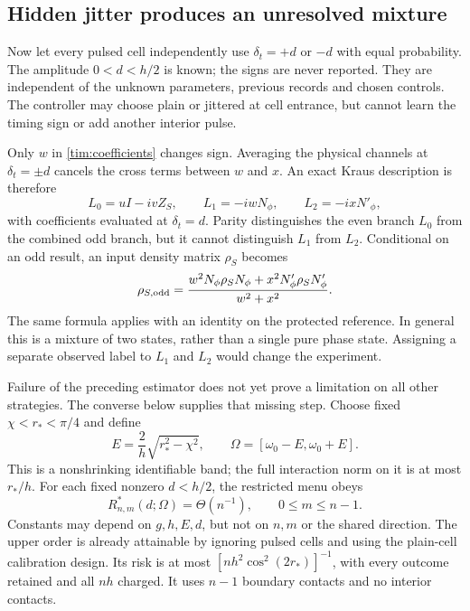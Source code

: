 \documentclass[11pt,a4paper]{article}
\numberwithin{equation}{section}
\theoremstyle{remark}
\begin{document}
\subsection{Hidden jitter produces an unresolved mixture}

Now let every pulsed cell independently use $\delta_t=+d$ or $-d$ with equal
probability. The amplitude $0<d<h/2$ is known; the signs are never reported.
They are independent of the unknown parameters, previous records and chosen
controls. The controller may choose plain or jittered at cell entrance,
but cannot learn the timing sign or add another interior pulse.

Only $w$ in \eqref{tim:coefficients} changes sign. Averaging the physical
channels at $\delta_t=\pm d$ cancels the cross terms between $w$ and $x$.
An exact Kraus description is therefore
\begin{equation}
 L_0=uI-ivZ_S,\qquad L_1=-iwN_\phi,\qquad L_2=-ixN'_\phi,
 \label{tim:jitter-kraus}
\end{equation}
with coefficients evaluated at $\delta_t=d$. Parity distinguishes the even
branch $L_0$ from the combined odd branch, but it cannot distinguish $L_1$
from $L_2$. Conditional on an odd result, an input density matrix $\rho_S$
becomes
\begin{equation}
 \rho_{S,\rm odd}
 =\frac{w^2N_\phi\rho_SN_\phi+x^2N'_\phi\rho_SN'_\phi}{w^2+x^2}.
 \label{tim:odd-mixture}
\end{equation}
The same formula applies with an identity on the protected reference.
In general this is a mixture of two states, rather than a single pure
phase state. Assigning a separate observed label to $L_1$ and $L_2$ would
change the experiment.

Failure of the preceding estimator does not yet prove a limitation on all
other strategies. The converse below supplies that missing step. Choose
fixed $\chi<r_*<\pi/4$ and define
\begin{equation}
 E=\frac{2}{h}\sqrt{r_*^2-\chi^2},\qquad
 \Omega=[\omega_0-E,\omega_0+E].
\end{equation}
This is a nonshrinking identifiable band; the full interaction norm on it is
at most $r_*/h$. For each fixed nonzero $d<h/2$, the restricted menu obeys
\begin{equation}
 R^*_{n,m}(d;\Omega)=\Theta(n^{-1}),\qquad 0\le m\le n-1.
 \label{tim:global-law}
\end{equation}
Constants may depend on $g,h,E,d$, but not on $n,m$ or the shared direction.
The upper order is already attainable by ignoring pulsed cells and using
the plain-cell calibration design. Its risk is at most
$[nh^2\cos^2(2r_*)]^{-1}$, with every outcome retained and all $nh$ charged.
It uses $n-1$ boundary contacts and no interior contacts.
\end{document}
